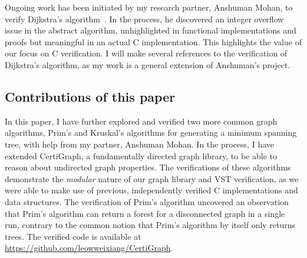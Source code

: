 \newline\newline
Ongoing work has been initiated by my research partner, Anshuman Mohan, to verify Dijkstra's algorithm~\cite{amdijkstra}. In the process, he discovered an integer overflow issue in the abstract algorithm, unhighlighted in functional implementations and proofs but meaningful in an actual C implementation. This highlights the value of our focus on C verification. I will make several references to the verification of Dijkstra's algorithm, as my work is a general extension of Anshuman's project.

\subsection{Contributions of this paper}

In this paper, I have further explored and verified two more common graph algorithms, Prim's and Kruskal's algorithms for generating a minimum spanning tree, with help from my partner, Anshuman Mohan. In the process, I have extended CertiGraph, a fundamentally directed graph library, to be able to reason about undirected graph properties. The verifications of these algorithms demonstrate the \textit{modular} nature of our graph library and VST verification, as we were able to make use of previous, independently verified C implementations and data structures. The verification of Prim's algorithm uncovered an observation that Prim's algorithm can return a forest for a disconnected graph in a single run, contrary to the common notion that Prim's algorithm by itself only returns trees.
\newline\newline
The verified code is available at \url{https://github.com/leowweixiang/CertiGraph}.